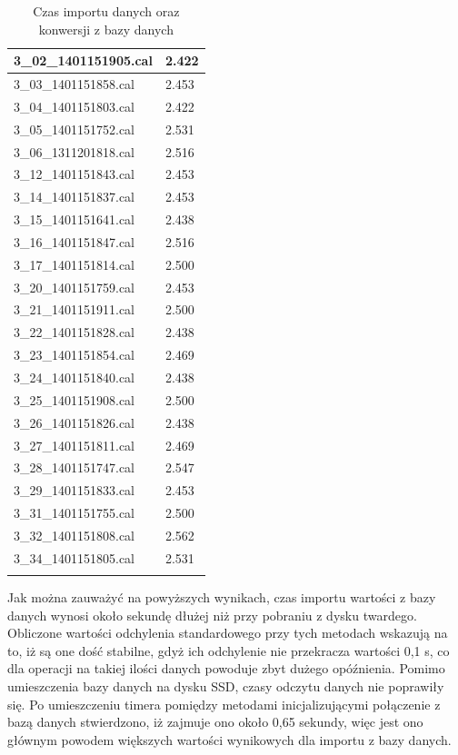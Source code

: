 \begin{longtable}{|l|l|}
    3\_02\_1401151905.cal & 2.422 \\ \hline
    3\_03\_1401151858.cal & 2.453 \\ \hline
    3\_04\_1401151803.cal & 2.422 \\ \hline
    3\_05\_1401151752.cal & 2.531 \\ \hline
    3\_06\_1311201818.cal & 2.516 \\ \hline
    3\_12\_1401151843.cal & 2.453 \\ \hline
    3\_14\_1401151837.cal & 2.453 \\ \hline
    3\_15\_1401151641.cal & 2.438 \\ \hline
    3\_16\_1401151847.cal & 2.516 \\ \hline
    3\_17\_1401151814.cal & 2.500 \\ \hline
    3\_20\_1401151759.cal & 2.453 \\ \hline
    3\_21\_1401151911.cal & 2.500 \\ \hline
    3\_22\_1401151828.cal & 2.438 \\ \hline
    3\_23\_1401151854.cal & 2.469 \\ \hline
    3\_24\_1401151840.cal & 2.438 \\ \hline
    3\_25\_1401151908.cal & 2.500 \\ \hline
    3\_26\_1401151826.cal & 2.438 \\ \hline
    3\_27\_1401151811.cal & 2.469 \\ \hline
    3\_28\_1401151747.cal & 2.547 \\ \hline
    3\_29\_1401151833.cal & 2.453 \\ \hline
    3\_31\_1401151755.cal & 2.500 \\ \hline
    3\_32\_1401151808.cal & 2.562 \\ \hline
    3\_34\_1401151805.cal & 2.531 \\ \hline
    \caption{Czas importu danych oraz konwersji z bazy danych}
    \label{tab:importdb}\\
\end{longtable}
Jak można zauważyć na powyższych wynikach, czas importu wartości z bazy danych wynosi około sekundę dłużej niż przy pobraniu z dysku twardego. Obliczone wartości odchylenia standardowego przy tych metodach wskazują na to, iż są one dość stabilne, gdyż ich odchylenie nie przekracza wartości 0,1 s, co dla operacji na takiej ilości danych powoduje zbyt dużego opóźnienia. Pomimo umieszczenia bazy danych na dysku SSD, czasy odczytu danych nie poprawiły się. Po umieszczeniu timera pomiędzy metodami inicjalizującymi połączenie z bazą danych stwierdzono, iż zajmuje ono około 0,65 sekundy, więc jest ono głównym powodem większych wartości wynikowych dla importu z bazy danych.
